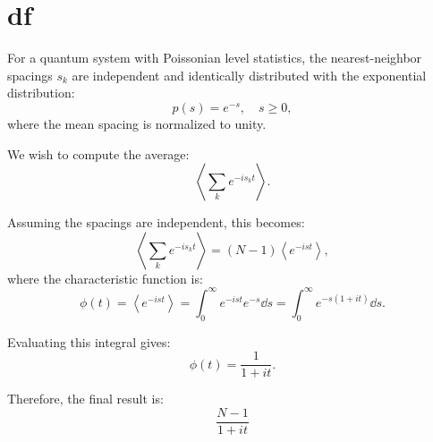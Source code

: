 \documentclass[10pt,a4paper]{article}
\begin{document}
\section{df}
For a quantum system with Poissonian level statistics, the nearest-neighbor spacings $s_k$ are independent and identically distributed with the exponential distribution:
\[
p(s) = e^{-s}, \quad s \geq 0,
\]
where the mean spacing is normalized to unity.

We wish to compute the average:
\[
\left\langle \sum_k e^{-i s_k t} \right\rangle.
\]

Assuming the spacings are independent, this becomes:
\[
\left\langle \sum_k e^{-i s_k t} \right\rangle = (N-1) \left\langle e^{-i s t} \right\rangle,
\]
where the characteristic function is:
\[
\phi(t) = \left\langle e^{-i s t} \right\rangle = \int_0^\infty e^{-i s t} e^{-s} \dd{s} = \int_0^\infty e^{-s(1 + i t)} \dd{s}.
\]

Evaluating this integral gives:
\[
\phi(t) = \frac{1}{1 + i t}.
\]

Therefore, the final result is:
\[
\boxed{\frac{N-1}{1+it}}
\]


\printbibliography
\end{document}
